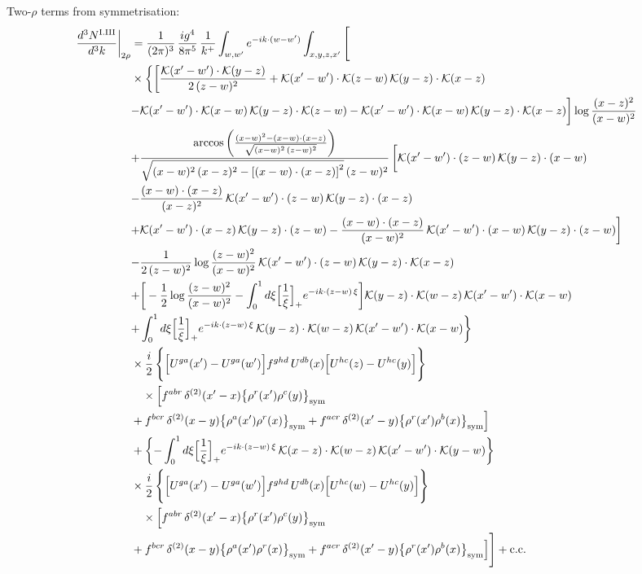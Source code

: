 \documentclass[9pt]{article}
\numberwithin{equation}{section}
\begin{document}
Two-$\rho$ terms from symmetrisation:
\begin{align}
\frac{d^{3}N^{\rm I.III}}{d^{3}k}\bigg|_{2\rho} &=\frac{1}{(2\pi)^{3}}\,\frac{ig^{4}}{8\pi^{5}}\,\frac{1}{k^{+}}\int_{w,w'}e^{-ik\cdot(w-w')}\int_{x,y,z,x'}\Bigg[\notag\\
&\times\bigg\{{\bigg[\frac{\mathcal{K}(x'-w')\cdot\mathcal{K}(y-z)}{2\,(z-w)^{2}}+\mathcal{K}(x'-w')\cdot\mathcal{K}(z-w)\,\mathcal{K}(y-z)\cdot\mathcal{K}(x-z)}\notag\\
&{-\mathcal{K}(x'-w')\cdot\mathcal{K}(x-w)\,\mathcal{K}(y-z)\cdot\mathcal{K}(z-w)-\mathcal{K}(x'-w')\cdot\mathcal{K}(x-w)\,\mathcal{K}(y-z)\cdot\mathcal{K}(x-z)\bigg]\log\frac{(x-z)^{2}}{(x-w)^{2}}}\notag\\
&{+\frac{\arccos\left(\frac{(x-w)^{2}-(x-w)\cdot (x-z)}{\sqrt{(x-w)^{2}\,(z-w)^{2}}}\right)}{\sqrt{(x-w)^{2}\,(x-z)^{2}-\left[(x-w)\cdot (x-z)\right]^{2}}\,(z-w)^{2}}\,\bigg[\mathcal{K}(x'-w')\cdot(z-w)\,\mathcal{K}(y-z)\cdot(x-w)}\notag\\
&{-\frac{(x-w)\cdot(x-z)}{(x-z)^{2}}\,\mathcal{K}(x'-w')\cdot(z-w)\,\mathcal{K}(y-z)\cdot(x-z)}\notag\\
&{+\mathcal{K}(x'-w')\cdot(x-z)\,\mathcal{K}(y-z)\cdot(z-w)-\frac{(x-w)\cdot(x-z)}{(x-w)^{2}}\,\mathcal{K}(x'-w')\cdot(x-w)\,\mathcal{K}(y-z)\cdot(z-w)\bigg]}\notag\\
&{-\frac{1}{2\,(z-w)^{2}}\log\frac{(z-w)^{2}}{(x-w)^{2}}\,\mathcal{K}(x'-w')\cdot(z-w)\,\mathcal{K}(y-z)\cdot\mathcal{K}(x-z)}\notag\\
&{+\bigg[-\frac{1}{2}\log\frac{(z-w)^{2}}{(x-w)^{2}}-\int_{0}^{1}d\xi\Big[\frac{1}{\xi}\Big]_{+}e^{-ik\cdot(z-w)\,\xi}\bigg]\mathcal{K}(y-z)\cdot\mathcal{K}(w-z)\,\mathcal{K}(x'-w')\cdot\mathcal{K}(x-w)}\notag\\
&{+\int_{0}^{1}d\xi\Big[\frac{1}{\xi}\Big]_{+}e^{-ik\cdot(z-w)\,\xi}\,\mathcal{K}(y-z)\cdot\mathcal{K}(w-z)\,\mathcal{K}(x'-w')\cdot\mathcal{K}(x-w)}\bigg\}\notag\\
&\times \frac{i}{2}\,\Bigg\{\Big[U^{ga}(x')-U^{ga}(w')\Big]f^{ghd}\,U^{db}(x)\Big[U^{hc}(z)-U^{hc}(y)\Big]\Bigg\}\notag\\&\quad\times\Big[f^{abr}\,\delta^{(2)}(x'-x)\big\{\rho^{r}(x')\rho^{c}(y)\big\}_{\rm sym}\notag\\
& +f^{bcr}\,\delta^{(2)}(x-y)\big\{\rho^{a}(x')\rho^{r}(x)\big\}_{\rm sym} +f^{acr}\,\delta^{(2)}(x'-y)\big\{\rho^{r}(x')\rho^{b}(x)\big\}_{\rm sym}\Big]\notag\\
&+\bigg\{{-\int_{0}^{1}d\xi\Big[\frac{1}{\xi}\Big]_{+}e^{-ik\cdot(z-w)\,\xi}\,\mathcal{K}(x-z)\cdot\mathcal{K}(w-z)\,\mathcal{K}(x'-w')\cdot\mathcal{K}(y-w)}\bigg\}\notag\\
&\times \frac{i}{2}\,\Bigg\{\Big[U^{ga}(x')-U^{ga}(w')\Big]f^{ghd}\,U^{db}(x)\Big[U^{hc}(w)-U^{hc}(y)\Big]\Bigg\}\notag\\&\quad\times\Big[f^{abr}\,\delta^{(2)}(x'-x)\big\{\rho^{r}(x')\rho^{c}(y)\big\}_{\rm sym}\notag\\
& +f^{bcr}\,\delta^{(2)}(x-y)\big\{\rho^{a}(x')\rho^{r}(x)\big\}_{\rm sym} +f^{acr}\,\delta^{(2)}(x'-y)\big\{\rho^{r}(x')\rho^{b}(x)\big\}_{\rm sym}\Big]\Bigg]+{\rm c.c.}\label{eq:H-I.III-2}
\end{align}
\end{document}
